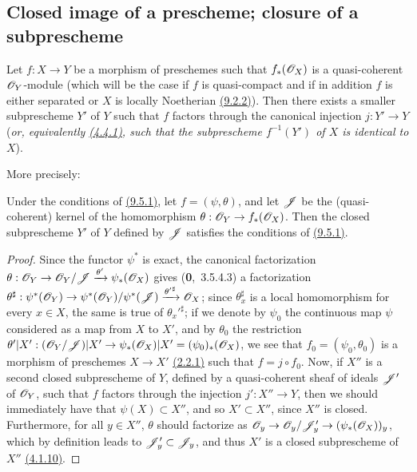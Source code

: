\subsection{Closed image of a prescheme; closure of a subprescheme}
\label{subsection-closed-image-and-closure}

\begin{prop}[9.5.1]
\label{prop-1.9.5.1}
Let $f:X\to Y$ be a morphism of preschemes such that $f_*(\mathscr{O}_X)$ is a quasi-coherent
$\mathscr{O}_Y$-module (which will be the case if $f$ is quasi-compact and if in addition $f$ is
either separated or $X$ is locally Noetherian \hyperref[cor-1.9.2.2]{(9.2.2)}). Then there exists a smaller
subprescheme $Y'$ of $Y$ such that $f$ factors through the canonical injection $j:Y'\to Y$
({\it or, equivalently \hyperref[prop-1.4.4.1]{(4.4.1)}, such that the subprescheme $f^{-1}(Y')$ of $X$ is
{\it identical} to $X$}).
\end{prop}

More precisely:
\begin{cor}[9.5.2]
\label{cor-1.9.5.2}
Under the conditions of \hyperref[prop-1.9.5.1]{(9.5.1)}, let $f=(\psi,\theta)$, and let $\mathscr{J}$ be the
(quasi-coherent) kernel of the homomorphism $\theta:\mathscr{O}_Y\to f_*(\mathscr{O}_X)$. Then the closed
subprescheme $Y'$ of $Y$ defined by $\mathscr{J}$ satisfies the conditions of \hyperref[prop-1.9.5.1]{(9.5.1)}.
\end{cor}

\begin{proof}
\label{proof-cor-1.9.5.2}
Since the functor $\psi^*$ is exact, the canonical factorization
$\theta:\mathscr{O}_Y\to\mathscr{O}_Y/\mathscr{J}\xrightarrow{\theta'}\psi_*(\mathscr{O}_X)$ gives (\textbf{0},~3.5.4.3)
a factorization
$\theta^\sharp:\psi^*(\mathscr{O}_Y)\to\psi^*(\mathscr{O}_Y)/\psi^*(\mathscr{J})
  \xrightarrow{{\theta'}^\sharp}\mathscr{O}_X$; since $\theta_x^\sharp$ is a local homomorphism for
every $x\in X$, the same is true of ${\theta_x'}^\sharp$; if we denote by $\psi_0$ the
continuous map $\psi$ considered as a map from $X$ to $X'$, and by $\theta_0$ the restriction
$\theta'|X':(\mathscr{O}_Y/\mathscr{J})|X'\to\psi_*(\mathscr{O}_X)|X'=(\psi_0)_*(\mathscr{O}_X)$, we see that
$f_0=(\psi_0,\theta_0)$ is a morphism of preschemes $X\to X'$ \hyperref[defn-1.2.2.1]{(2.2.1)} such that
$f=j\circ f_0$. Now, if $X''$ is
a second closed subprescheme of $Y$, defined by a quasi-coherent sheaf of ideals $\mathscr{J}'$ of
$\mathscr{O}_Y$, such that $f$ factors through the injection $j':X''\to Y$, then we should
immediately have that $\psi(X)\subset X''$, and so $X'\subset X''$, since $X''$ is closed.
Furthermore, for all $y\in X''$, $\theta$ should factorize as
$\mathscr{O}_y\to\mathscr{O}_y/\mathscr{J}'_y\to(\psi_*(\mathscr{O}_X))_y$, which by definition leads to
$\mathscr{J}'_y\subset\mathscr{J}_y$, and thus $X'$ is a closed subprescheme of $X''$
\hyperref[cor-1.4.1.10]{(4.1.10)}.
\end{proof}

